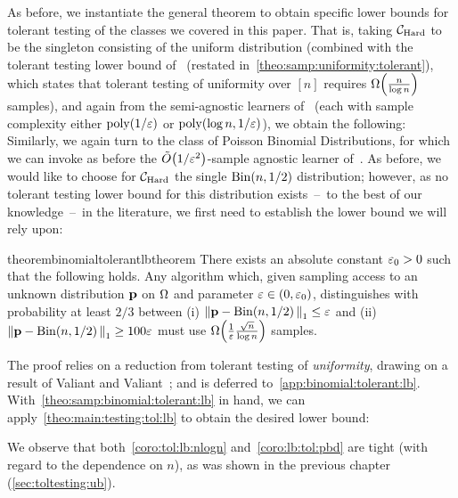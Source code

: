 As before, we instantiate the general theorem to obtain specific lower bounds for tolerant testing of the classes we covered in this paper. That is, taking $\mathcal{C}_{\rm Hard}$ to be the singleton consisting of the uniform distribution (combined with the tolerant testing lower bound of~\cite{ValiantValiant:10lb} (restated in~\cref{theo:samp:uniformity:tolerant}), which states that tolerant testing of uniformity over $[n]$ requires $\bigOmega{\frac{n}{\log n}}$ samples), and again from the semi-agnostic learners of~\cite{CDSS:13,CDSS:14} (each with sample complexity either $\operatorname*{poly}(1/\varepsilon)$ or $\operatorname*{poly}(\log n,1/\varepsilon)$), we obtain the following:
\corolbtolnlogn*
Similarly, we again turn to the class of Poisson Binomial Distributions, for which we can invoke as before the $\tildeO{1/\eps^2}$-sample agnostic learner of~\cite{DDS:PBD:12}. As before, we would like to choose for $\mathcal{C}_{\rm Hard}$ the single $\operatorname{Bin}\!\left( n, 1/2 \right)$ distribution; however, as no tolerant testing lower bound for this distribution exists~--~to the best of our knowledge~--~in the literature, we first need to establish the lower bound we will rely upon:

\begin{restatable}{theorem}{binomialtolerantlbtheorem}\label{theo:samp:binomial:tolerant:lb}
    There exists an absolute constant $\varepsilon_0>0$ such that the following holds. Any algorithm which, given sampling access to an unknown distribution $\mathbf{p}$ on ${\Omega}$ and parameter $\varepsilon \in (0,\varepsilon_0)$, distinguishes with probability at least $2/3$ between \textsf{(i)} ${\lVert\mathbf{p}-\operatorname{Bin}\!\left( n, 1/2 \right){\rVert}}_1 \leq \varepsilon$ and \textsf{(ii)} ${\lVert\mathbf{p}-\operatorname{Bin}\!\left( n, 1/2 \right){\rVert}}_1 \geq 100\varepsilon$ must use $\bigOmega{\frac{1}{\eps}\frac{\sqrt{n}}{\log n}}$ samples.
\end{restatable}
The proof relies on a reduction from tolerant testing of \emph{uniformity}, drawing on a result of Valiant and Valiant~\cite{ValiantValiant:10lb}; and is deferred to~\cref{app:binomial:tolerant:lb}. With~\cref{theo:samp:binomial:tolerant:lb} in hand, we can apply~\cref{theo:main:testing:tol:lb} to obtain the desired lower bound:
\corolbtolpbd*

\noindent We observe that both~\cref{coro:tol:lb:nlogn} and~\cref{coro:lb:tol:pbd} are tight (with regard to the dependence on $n$), as was shown in the previous chapter (\cref{sec:toltesting:ub}).

